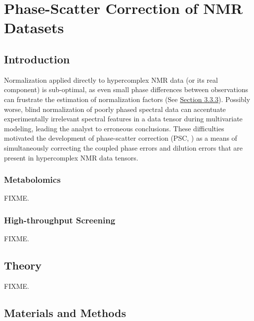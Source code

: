 
\chapter{Phase-Scatter Correction of NMR Datasets}

\section{Introduction}

\begin{doublespace}
Normalization applied directly to hypercomplex NMR data (or its real component)
is sub-optimal, as even small phase differences between observations can
frustrate the estimation of normalization factors
(See \hyperlink{section.3.3.3}{Section 3.3.3}). Possibly worse, blind
normalization of poorly phased spectral data can accentuate experimentally
irrelevant spectral features in a data tensor during multivariate modeling,
leading the analyst to erroneous conclusions. These difficulties motivated
the development of phase-scatter correction (PSC, \cite{worley:abio2013}) as
a means of simultaneously correcting the coupled phase errors and dilution
errors that are present in hypercomplex NMR data tensors.
\end{doublespace}

\subsection{Metabolomics}

\begin{doublespace}
FIXME.
\end{doublespace}

\subsection{High-throughput Screening}

\begin{doublespace}
FIXME.
\end{doublespace}

\section{Theory}

\begin{doublespace}
FIXME.
\end{doublespace}

\section{Materials and Methods}

